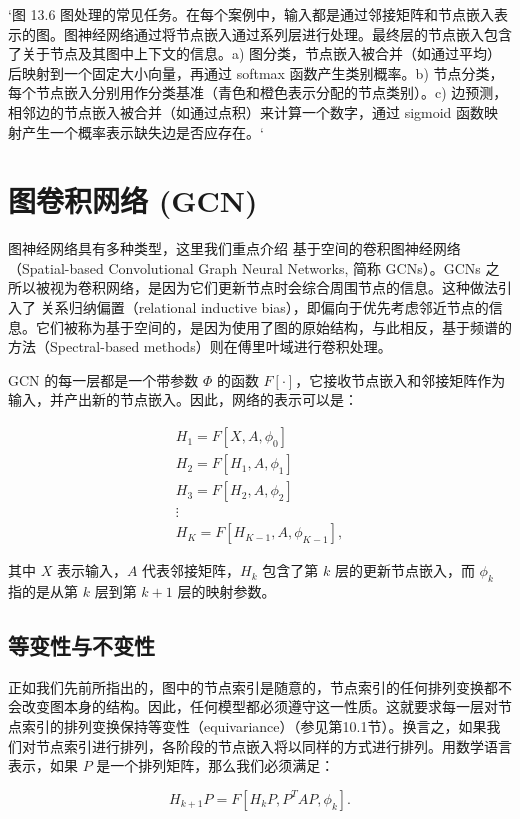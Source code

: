 `图 13.6 图处理的常见任务。在每个案例中，输入都是通过邻接矩阵和节点嵌入表示的图。图神经网络通过将节点嵌入通过系列层进行处理。最终层的节点嵌入包含了关于节点及其图中上下文的信息。a) 图分类，节点嵌入被合并（如通过平均）后映射到一个固定大小向量，再通过 softmax 函数产生类别概率。b) 节点分类，每个节点嵌入分别用作分类基准（青色和橙色表示分配的节点类别）。c) 边预测，相邻边的节点嵌入被合并（如通过点积）来计算一个数字，通过 sigmoid 函数映射产生一个概率表示缺失边是否应存在。`

\section{图卷积网络 (GCN)}
图神经网络具有多种类型，这里我们重点介绍 基于空间的卷积图神经网络（Spatial-based Convolutional Graph Neural Networks, 简称 GCNs）。GCNs 之所以被视为卷积网络，是因为它们更新节点时会综合周围节点的信息。这种做法引入了 关系归纳偏置（relational inductive bias），即偏向于优先考虑邻近节点的信息。它们被称为基于空间的，是因为使用了图的原始结构，与此相反，基于频谱的方法（Spectral-based methods）则在傅里叶域进行卷积处理。

GCN 的每一层都是一个带参数 \(\Phi\) 的函数 \(F[\cdot]\)，它接收节点嵌入和邻接矩阵作为输入，并产出新的节点嵌入。因此，网络的表示可以是：


\begin{align}
H_1 = F[X, A, \phi_0] \\
H_2 = F[H_1, A, \phi_1] \\
H_3 = F[H_2, A, \phi_2] \\
\vdots \\
H_K = F[H_{K-1}, A, \phi_{K-1}], \tag{13.5}
\end{align} 


其中 \(X\) 表示输入，\(A\) 代表邻接矩阵，\(H_k\) 包含了第 \(k\) 层的更新节点嵌入，而 \(\phi_k\) 指的是从第 \(k\) 层到第 \(k+1\) 层的映射参数。

\subsection{等变性与不变性}
正如我们先前所指出的，图中的节点索引是随意的，节点索引的任何排列变换都不会改变图本身的结构。因此，任何模型都必须遵守这一性质。这就要求每一层对节点索引的排列变换保持等变性（equivariance）（参见第10.1节）。换言之，如果我们对节点索引进行排列，各阶段的节点嵌入将以同样的方式进行排列。用数学语言表示，如果 \(P\) 是一个排列矩阵，那么我们必须满足：

\[
H_{k+1}P = F[H_kP, P^TAP, \phi_k]. \tag{13.6}
\]

